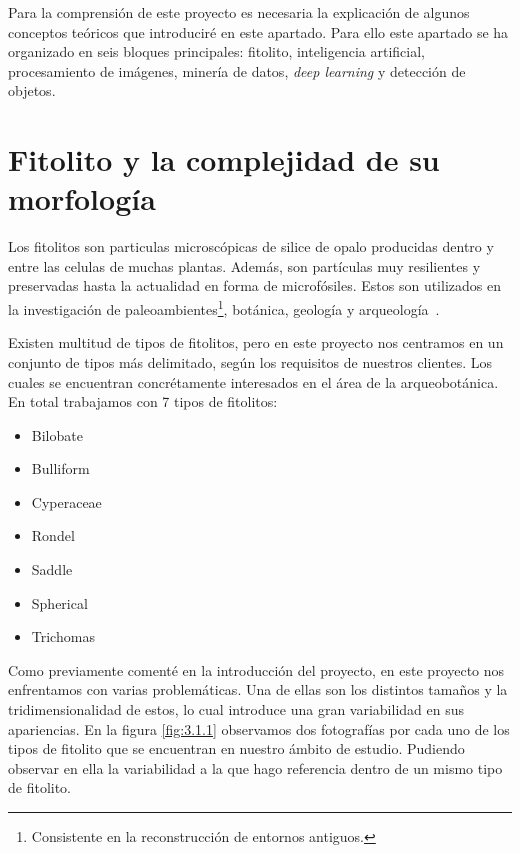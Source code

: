 

Para la comprensión de este proyecto es necesaria la explicación de algunos conceptos teóricos que introduciré en este apartado. Para ello este apartado se ha organizado en seis bloques principales: fitolito, inteligencia artificial, procesamiento de imágenes, minería de datos, \textit{deep learning} y detección de objetos.

\section{Fitolito y la complejidad de su morfología}

Los fitolitos son particulas microscópicas de silice de opalo producidas dentro y entre las celulas de muchas plantas. Además, son partículas muy resilientes y preservadas hasta la actualidad en forma de microfósiles. Estos son utilizados en la investigación de paleoambientes\footnote{Consistente en la reconstrucción de entornos antiguos.}, botánica, geología y arqueología~\cite{phytolith}.

Existen multitud de tipos de fitolitos, pero en este proyecto nos centramos en un conjunto de tipos más delimitado, según los requisitos de nuestros clientes. Los cuales se encuentran concrétamente interesados en el área de la arqueobotánica. En total trabajamos con 7 tipos de fitolitos:

\begin{multicols}{2}
	\begin{itemize}
		\item Bilobate
		\item Bulliform
		\item Cyperaceae
		\item Rondel
		\item Saddle
		\item Spherical
		\item Trichomas
	\end{itemize}
\end{multicols}

Como previamente comenté en la introducción del proyecto, en este proyecto nos enfrentamos con varias problemáticas. Una de ellas son los distintos tamaños y la tridimensionalidad de estos, lo cual introduce una gran variabilidad en sus apariencias. En la figura \ref{fig:3.1.1} observamos dos fotografías por cada uno de los tipos de fitolito que se encuentran en nuestro ámbito de estudio. Pudiendo observar en ella la variabilidad a la que hago referencia dentro de un mismo tipo de fitolito.

